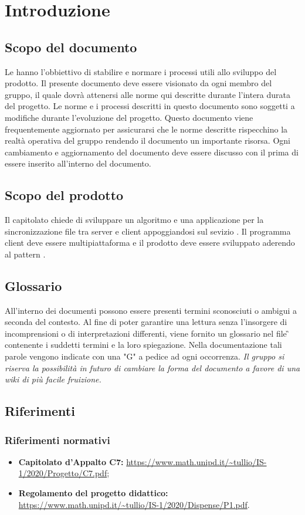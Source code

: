 \section{Introduzione}
\subsection{Scopo del documento}
Le \NdP{} hanno l'obbiettivo di stabilire e normare i processi utili allo sviluppo del prodotto.
Il presente documento deve essere visionato da ogni membro del gruppo, il quale dovrà attenersi alle norme qui descritte durante l'intera durata del progetto.
Le norme e i processi descritti in questo documento sono soggetti a modifiche durante l'evoluzione del progetto.
Questo documento viene frequentemente aggiornato per assicurarsi che le norme descritte rispecchino la realtà operativa del gruppo rendendo il documento un importante risorsa.
Ogni cambiamento e aggiornamento del documento deve essere discusso con il \RdP{} prima di essere inserito all'interno del documento.
\subsection{Scopo del prodotto}
Il capitolato chiede di sviluppare un algoritmo e una applicazione per la sincronizzazione file tra server e client appoggiandosi sul sevizio .
Il programma client deve essere multipiattaforma e il prodotto deve essere sviluppato aderendo al pattern .
\subsection{Glossario}
All'interno dei documenti possono essere presenti termini sconosciuti o ambigui a seconda del contesto. Al fine di poter garantire una lettura senza l'insorgere di incomprensioni o di interpretazioni differenti, viene fornito un glossario nel file \G{} contenente i suddetti termini e la loro spiegazione. Nella documentazione tali parole vengono indicate con una "G" a pedice ad ogni occorrenza. \newline
\textit{Il gruppo si riserva la possibilità in futuro di cambiare la forma del documento a favore di una wiki di più facile fruizione.}
\subsection{Riferimenti}
\subsubsection*{Riferimenti normativi}
\begin{itemize}
	\item \textbf{Capitolato d'Appalto C7:} \url{https://www.math.unipd.it/~tullio/IS-1/2020/Progetto/C7.pdf};
	\item \textbf{Regolamento del progetto didattico:} \url{https://www.math.unipd.it/~tullio/IS-1/2020/Dispense/P1.pdf}.
\end{itemize}

